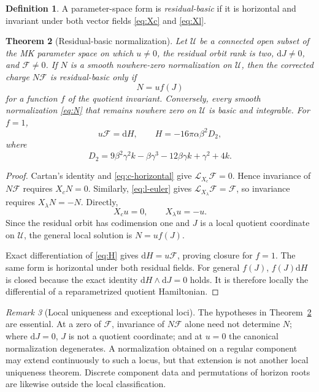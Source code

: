 \documentclass[11pt]{article}
\newtheorem{theorem}{Theorem}[section]
\theoremstyle{definition}
\newtheorem{definition}[theorem]{Definition}
\theoremstyle{remark}
\newtheorem{remark}[theorem]{Remark}
\newcommand{\dd}{\mathrm d}
\newcommand{\Lie}{\mathcal L}
\begin{document}
\begin{definition}
A parameter-space form is \emph{residual-basic} if it is horizontal and
invariant under both vector fields \eqref{eq:Xc} and \eqref{eq:Xl}.
\end{definition}

\begin{theorem}[Residual-basic normalization]
\label{thm:normalization}
Let \(\mathcal U\) be a connected open subset of the MK parameter space on
which \(u\neq0\), the residual orbit rank is two, \(\dd J\neq0\), and
\(\mathcal F\neq0\).  If \(N\) is a smooth nowhere-zero normalization on
\(\mathcal U\), then the corrected charge \(N\mathcal F\) is
residual-basic only if
\begin{equation}\label{eq:N}
 N=u f(J)
\end{equation}
for a function \(f\) of the quotient invariant.  Conversely, every smooth
normalization \eqref{eq:N} that remains nowhere zero on \(\mathcal U\) is
basic and integrable.  For \(f=1\),
\begin{equation}\label{eq:H}
 u\mathcal F=\dd H,\qquad
 H=-16\pi\alpha\beta^2D_2,
\end{equation}
where
\begin{equation}\label{eq:D2}
 D_2=9\beta^2\gamma^2k-\beta\gamma^3
     -12\beta\gamma k+\gamma^2+4k.
\end{equation}
\end{theorem}

\begin{proof}
Cartan's identity and \eqref{eq:c-horizontal} give
\(\Lie_{X_c}\mathcal F=0\).  Hence invariance of \(N\mathcal F\) requires
\(X_cN=0\).  Similarly, \eqref{eq:l-euler} gives
\(\Lie_{X_\lambda}\mathcal F=\mathcal F\), so invariance requires
\(X_\lambda N=-N\).  Directly,
\[
 X_cu=0,\qquad X_\lambda u=-u.
\]
Since the residual orbit has codimension one and \(J\) is a local quotient
coordinate on \(\mathcal U\), the general local solution is \(N=uf(J)\).

Exact differentiation of \eqref{eq:H} gives
\(\dd H=u\mathcal F\), proving closure for \(f=1\).  The same form is
horizontal under both residual fields.  For general \(f(J)\),
\(f(J)\dd H\) is closed because the exact identity
\(\dd H\wedge\dd J=0\) holds.  It is therefore locally the differential of
a reparametrized quotient Hamiltonian.
\end{proof}

\begin{remark}[Local uniqueness and exceptional loci]
The hypotheses in Theorem~\ref{thm:normalization} are essential.  At a zero
of \(\mathcal F\), invariance of \(N\mathcal F\) alone need not determine
\(N\); where \(\dd J=0\), \(J\) is not a quotient coordinate; and at
\(u=0\) the canonical normalization degenerates.  A normalization obtained
on a regular component may extend continuously to such a locus, but that
extension is not another local uniqueness theorem.  Discrete component data
and permutations of horizon roots are likewise outside the local
classification.
\end{remark}
\end{document}
